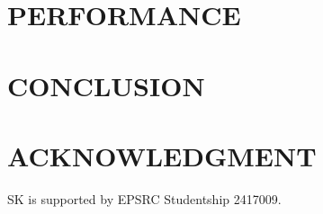 \documentclass{IEEEcsmag}
\begin{document}


\section{PERFORMANCE}


\section{CONCLUSION}


\section{ACKNOWLEDGMENT}

SK is supported by EPSRC Studentship 2417009.
\end{document}
